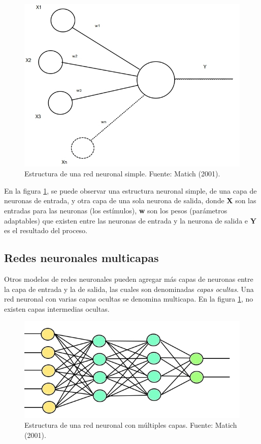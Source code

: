 \documentclass[a4paper,12pt,oneside,spanish]{book}
\begin{document}
\begin{figure}[h!]
	\includegraphics[width=340pt]{Imagenes/network1.jpg}
	\centering
	\caption{Estructura de una red neuronal simple. Fuente: Matich (2001).}
	\label{fig:network1}
\end{figure}

En la figura \ref{fig:network1}, se puede observar una estructura neuronal simple, de una capa de neuronas de entrada, y otra capa de una sola neurona de salida, donde \textbf{X} son las entradas para las neuronas (los estímulos), \textbf{w} son los pesos (parámetros adaptables) que existen entre las neuronas de entrada y la neurona de salida e \textbf{Y} es el resultado del proceso. \par

\subsection{Redes neuronales multicapas}

Otros modelos de redes neuronales pueden agregar más capas de neuronas entre la capa de entrada y la de salida, las cuales son denominadas \textit{capas ocultas}. Una red neuronal con varias capas ocultas se denomina multicapa. En la figura \ref{fig:network1}, no existen capas intermedias ocultas.

\begin{figure}[h!]
	\includegraphics[width=380pt]{Imagenes/network2.jpg}
	\centering
	\caption{Estructura de una red neuronal con múltiples capas. Fuente: Matich (2001).}
	\label{fig:network2}
\end{figure}
\end{document}
